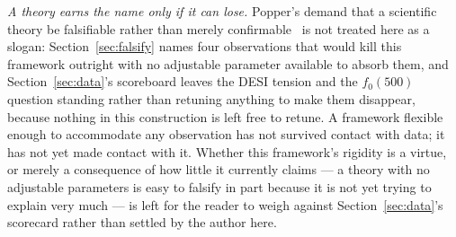 \documentclass[aps,prd,twocolumn,superscriptaddress,nofootinbib]{revtex4-2}
\begin{document}
\emph{A theory earns the name only if it can lose.} Popper's demand that
a scientific theory be falsifiable rather than merely confirmable~\cite{Popper1959}
is not treated here as a slogan: Section~\ref{sec:falsify} names four
observations that would kill this framework outright with no adjustable
parameter available to absorb them, and Section~\ref{sec:data}'s
scoreboard leaves the DESI tension and the $f_0(500)$ question standing
rather than retuning anything to make them disappear, because nothing in
this construction is left free to retune. A framework flexible enough to
accommodate any observation has not survived contact with data; it has
not yet made contact with it. Whether this framework's rigidity is a
virtue, or merely a consequence of how little it currently claims — a
theory with no adjustable parameters is easy to falsify in part because
it is not yet trying to explain very much — is left for the reader to
weigh against Section~\ref{sec:data}'s scorecard rather than settled by
the author here.
\end{document}
